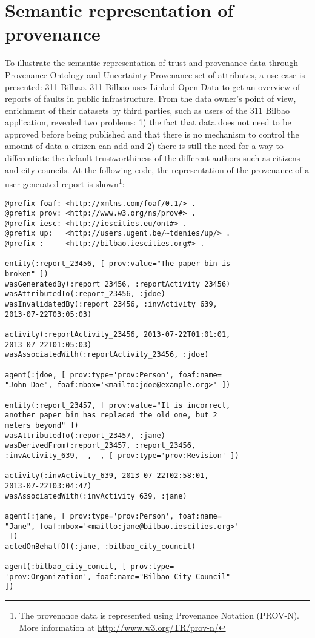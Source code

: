 \section{Semantic representation of provenance}
\label{sec:use_cases}

To illustrate the semantic representation of trust and provenance data through Provenance Ontology and Uncertainty Provenance set of attributes, a use case is presented: 311 Bilbao. 311 Bilbao uses Linked Open Data to get an overview of reports of faults in public infrastructure. From the data owner’s point of view, enrichment of their datasets by third parties, such as users of the 311 Bilbao application, revealed two problems: 1) the fact that data does not need to be approved before being published and that there is no mechanism to control the amount of data a citizen can add and 2) there is still the need for a way to differentiate the default trustworthiness of the different authors such as citizens and city councils. At the following code, the representation of the provenance of a user generated report is shown\footnote{The provenance data is represented using Provenance Notation (PROV-N). More information at \url{http://www.w3.org/TR/prov-n/}}:

\lstset{numbers=left, basicstyle=\ttfamily\scriptsize,}
\begin{lstlisting}
@prefix foaf: <http://xmlns.com/foaf/0.1/> .
@prefix prov: <http://www.w3.org/ns/prov#> .
@prefix iesc: <http://iescities.eu/ont#> .
@prefix up:   <http://users.ugent.be/~tdenies/up/> .
@prefix :     <http://bilbao.iescities.org#> .

entity(:report_23456, [ prov:value="The paper bin is
broken" ])
wasGeneratedBy(:report_23456, :reportActivity_23456)
wasAttributedTo(:report_23456, :jdoe)
wasInvalidatedBy(:report_23456, :invActivity_639,
2013-07-22T03:05:03)

activity(:reportActivity_23456, 2013-07-22T01:01:01,
2013-07-22T01:05:03)
wasAssociatedWith(:reportActivity_23456, :jdoe)

agent(:jdoe, [ prov:type='prov:Person', foaf:name=
"John Doe", foaf:mbox='<mailto:jdoe@example.org>' ])

entity(:report_23457, [ prov:value="It is incorrect,
another paper bin has replaced the old one, but 2
meters beyond" ])
wasAttributedTo(:report_23457, :jane)
wasDerivedFrom(:report_23457, :report_23456,
:invActivity_639, -, -, [ prov:type='prov:Revision' ])

activity(:invActivity_639, 2013-07-22T02:58:01,
2013-07-22T03:04:47)
wasAssociatedWith(:invActivity_639, :jane)

agent(:jane, [ prov:type='prov:Person', foaf:name=
"Jane", foaf:mbox='<mailto:jane@bilbao.iescities.org>'
 ])
actedOnBehalfOf(:jane, :bilbao_city_council)

agent(:bilbao_city_concil, [ prov:type=
'prov:Organization', foaf:name="Bilbao City Council"
])

\end{lstlisting}

